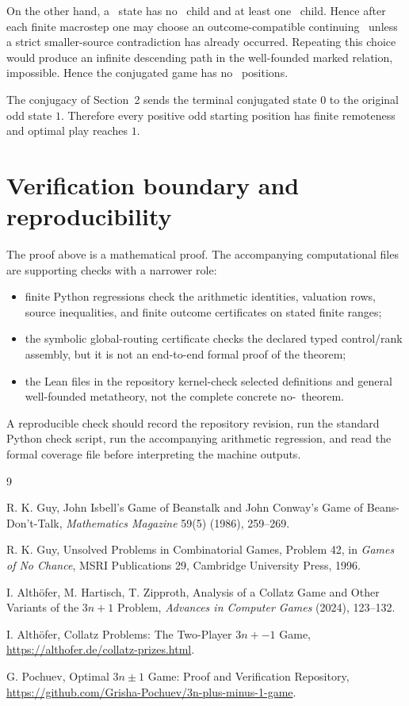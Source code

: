 On the other hand, a \DRAW\ state has no \LOSS\ child and at least one \DRAW\
child. Hence after each finite macrostep one may choose an outcome-compatible
continuing \DRAW\ unless a strict smaller-source contradiction has already
occurred. Repeating this choice would produce an infinite descending path in the
well-founded marked relation, impossible. Hence the conjugated game has no
\DRAW\ positions.

The conjugacy of Section~2 sends the terminal conjugated state $0$ to the
original odd state $1$. Therefore every positive odd starting position has finite
remoteness and optimal play reaches $1$.

\section{Verification boundary and reproducibility}

The proof above is a mathematical proof. The accompanying computational files
are supporting checks with a narrower role:
\begin{itemize}[leftmargin=*]
\item finite Python regressions check the arithmetic identities, valuation rows,
      source inequalities, and finite outcome certificates on stated finite
      ranges;
\item the symbolic global-routing certificate checks the declared typed
      control/rank assembly, but it is not an end-to-end formal proof of the
      theorem;
\item the Lean files in the repository kernel-check selected definitions and
      general well-founded metatheory, not the complete concrete no-\DRAW\
      theorem.
\end{itemize}
A reproducible check should record the repository revision, run the standard
Python check script, run the accompanying arithmetic regression, and read the formal
coverage file before interpreting the machine outputs.

\begin{thebibliography}{9}

R. K. Guy,
John Isbell's Game of Beanstalk and John Conway's Game of Beans-Don't-Talk,
\emph{Mathematics Magazine} 59(5) (1986), 259--269.

R. K. Guy,
Unsolved Problems in Combinatorial Games, Problem 42,
in \emph{Games of No Chance}, MSRI Publications 29, Cambridge University Press,
1996.

I. Alth\"ofer, M. Hartisch, T. Zipproth,
Analysis of a Collatz Game and Other Variants of the $3n+1$ Problem,
\emph{Advances in Computer Games} (2024), 123--132.

I. Alth\"ofer,
Collatz Problems: The Two-Player $3n+-1$ Game,
\url{https://althofer.de/collatz-prizes.html}.

G. Pochuev,
Optimal $3n\pm1$ Game: Proof and Verification Repository,
\url{https://github.com/Grisha-Pochuev/3n-plus-minus-1-game}.

\end{thebibliography}


